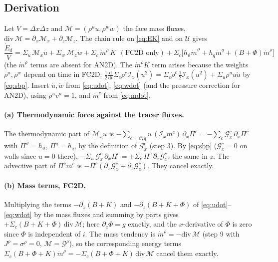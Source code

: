 \documentclass[11pt,a4paper]{article}
\newcommand{\vt}{\vartheta}                    %
\newcommand{\hth}{{h_{\vartheta}}}               %
\newcommand{\hq}{{h_q}}                          %
\newcommand{\Ix}{\mathcal{I}_x}
\begin{document}
\subsection{Derivation}
Let $V=\Delta x\Delta z$ and $\mathcal M=(\rho^uu,\rho^ww)$ the face mass fluxes, $\mathrm{div}\,\mathcal M=\partial_x\mathcal M_x+\partial_z\mathcal M_z$. The chain rule on \eqref{eq:EK} and on $\mathcal U$ gives
\begin{equation}
  \frac{\dot E_d}{V}=\Sigma_u\,\mathcal M_x\dot u+\Sigma_w\,\mathcal M_z\dot w+\Sigma_c\,\dot m^\rho\,K\ \ (\text{FC2D only})+\Sigma_c\big[\hth\dot m^\vt+\hq\dot m^q+(B+\Phi)\dot m^\rho\big]
\end{equation}
(the $\dot m^\rho$ terms are absent for AN2D). The $\dot m^\rho K$ term arises because the weights $\rho^u,\rho^w$ depend on time in FC2D: $\tfrac12\tfrac{\mathrm d}{\mathrm dt}\Sigma_c\rho^c\Ix(u^2)=\Sigma_c\dot\rho^c\,\tfrac12\Ix(u^2)+\Sigma_u\rho^uu\dot u$ by \eqref{eq:sbp}.
Insert $\dot u,\dot w$ from \eqref{eq:udot}, \eqref{eq:wdot} (and the pressure correction for AN2D), using $\rho^uv^u=1$, and $\dot m^c$ from \eqref{eq:mdot}.

\paragraph{(a) Thermodynamic force against the tracer fluxes.} The thermodynamic part of $\mathcal M_x\dot u$ is $-\sum_{c=\vt,q}u\,(\Ix m^c)\,\partial_x\Pi^c=-\sum_c\mathcal G^c_x\,\partial_x\Pi^c$ with $\Pi^\vt=\hth$, $\Pi^q=\hq$, by the definition of $\mathcal G^c_x$ (step 3).
By \eqref{eq:sbp} ($\mathcal G^c_x=0$ on walls since $u=0$ there), $-\Sigma_u\,\mathcal G^c_x\,\partial_x\Pi^c=+\Sigma_c\,\Pi^c\,\partial_x\mathcal G^c_x$; the same in $z$. The advective part of $\Pi^c\dot m^c$ is $-\Pi^c(\partial_x\mathcal G^c_x+\partial_z\mathcal G^c_z)$. They cancel exactly.

\paragraph{(b) Mass terms, FC2D.} Multiplying the terms $-\partial_x(B+K)$ and $-\partial_z(B+K+\Phi)$ of \eqref{eq:udot}--\eqref{eq:wdot} by the mass fluxes and summing by parts gives $+\Sigma_c(B+K+\Phi)\,\mathrm{div}\,\mathcal M$; here $\partial_z\Phi=g$ exactly, and the $x$-derivative of $\Phi$ is zero since $\Phi$ is independent of $i$.
The mass tendency is $\dot m^\rho=-\mathrm{div}\,\mathcal M$ (step 9 with $J^\rho=\sigma^\rho=0$, $\mathcal M=\mathcal G^\rho$), so the corresponding energy terms $\Sigma_c(B+\Phi+K)\dot m^\rho=-\Sigma_c(B+\Phi+K)\,\mathrm{div}\,\mathcal M$ cancel them exactly.
\end{document}
